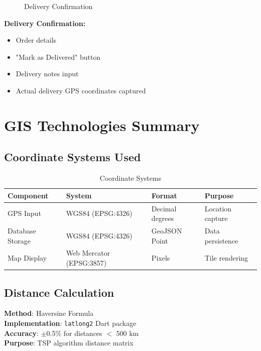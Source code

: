 \documentclass[12pt,a4paper]{article}
\begin{document}
\begin{figure}[h]
    \centering
    \caption{Delivery Confirmation}
\end{figure}

\textbf{Delivery Confirmation:}
\begin{itemize}
    \item Order details
    \item "Mark as Delivered" button
    \item Delivery notes input
    \item Actual delivery GPS coordinates captured
\end{itemize}

\newpage

\section{GIS Technologies Summary}

\subsection{Coordinate Systems Used}

\begin{table}[h]
\centering
\begin{tabular}{|l|l|l|l|}
\hline
\textbf{Component} & \textbf{System} & \textbf{Format} & \textbf{Purpose} \\ \hline
GPS Input & WGS84 (EPSG:4326) & Decimal degrees & Location capture \\ \hline
Database Storage & WGS84 (EPSG:4326) & GeoJSON Point & Data persistence \\ \hline
Map Display & Web Mercator (EPSG:3857) & Pixels & Tile rendering \\ \hline
\end{tabular}
\caption{Coordinate Systems}
\end{table}

\subsection{Distance Calculation}

\textbf{Method}: Haversine Formula\\
\textbf{Implementation}: \texttt{latlong2} Dart package\\
\textbf{Accuracy}: $\pm$0.5\% for distances $<$ 500 km\\
\textbf{Purpose}: TSP algorithm distance matrix
\end{document}
